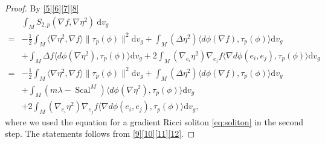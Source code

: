 \documentclass[12pt,UTF8]{article}
\theoremstyle{plain}
\theoremstyle{definition}
\def\d {\mathrm{d}}
\def\na{\ensuremath{\nabla}}
\renewcommand{\d}[1]{\mathbb{#1}}
\renewcommand{\(}{\left(}
\renewcommand{\)}{\right)}
\numberwithin{equation}{subsection}
\def\na{\nabla}
\newcommand{\dv}{\operatorname{div}}
\renewcommand{\(}{\left(}
\renewcommand{\)}{\right)}
\def\d{\mathrm{d}}
\def \d {\mathrm{d}}
\def\dv{\d v_g}
\numberwithin{equation}{section}
\begin{document}
\begin{proof}
By \eqref{5}\eqref{6}\eqref{7}\eqref{8}
\begin{equation}\label{12}
	\begin{split}
			&\int_M S_{2,p}(\nabla f,\nabla\eta^2)~\dv\\
		=&		-\frac{1}{2}\int_M\langle\nabla\eta^2,\nabla f\rangle\|\tau_p(\phi)\|^2 \dv 
		+\int_M(\Delta\eta^2)\langle d\phi(\nabla f),\tau_p(\phi)\rangle \dv \\
		\nonumber&+\int_M\Delta f\langle d\phi(\nabla\eta^2),\tau_p(\phi)\rangle \dv  
		+2\int_M(\nabla_{e_i}\eta^2)\nabla_{e_j}f\langle\na d\phi(e_i,e_j),\tau_p(\phi)\rangle \dv\\
		=&-\frac{1}{2}\int_M\langle\nabla\eta^2,\nabla f\rangle\|\tau_p(\phi)\|^2 \dv 
		+\int_M(\Delta\eta^2)\langle d\phi(\nabla f),\tau_p(\phi)\rangle \dv \\
		\nonumber&+\int_M(m\lambda-\operatorname{Scal}^M)\langle d\phi(\nabla\eta^2),\tau_p(\phi)\rangle \dv \\
		&+2\int_M(\nabla_{e_i}\eta^2)\nabla_{e_j}f\langle\na d\phi(e_i,e_j),\tau_p(\phi)\rangle \dv,
	\end{split}
\end{equation}
	where we used the equation for a gradient Ricci soliton \eqref{eq:soliton} 
	in the second step. The statements follows from \eqref{9}\eqref{10}\eqref{11}\eqref{12}.
\end{proof}
\end{document}
